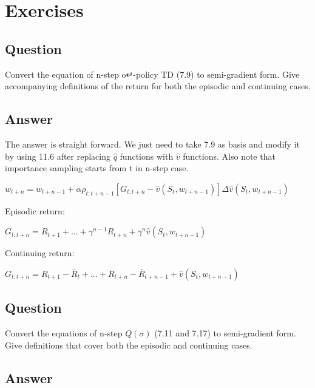\documentclass[11pt]{article}
\begin{document}
    \maketitle
    \setcounter{section}{10}


    \section{Exercises}

    \subsection{Question}

    Convert the equation of n-step o↵-policy TD (7.9) to semi-gradient form.
    Give accompanying definitions of the return for both the episodic and continuing cases.

    \subsection*{Answer}

    The answer is straight forward.
    We just need to take 7.9 as basis and modify it by using 11.6 after replacing $\hat{q}$ functions with $\hat{v}$ functions.
    Also note that importance sampling starts from t in n-step case.

    \noindent $ w_{t+n} = w_{t+n-1} + \alpha \rho_{t:t+n-1} [G_{t:t+n} - \hat{v}(S_t, w_{t+n-1}) ] \Delta\hat{v}(S_t, w_{t+n-1})$

    \hfill \break
    Episodic return:

    \noindent $ G_{t:t+n} = R_{t+1} + \ldots + \gamma^{n-1} R_{t+n} + \gamma^n \hat{v}(S_t,w_{t+n-1}) $

    \hfill \break
    \noindent Continuing return:

    \noindent $ G_{t:t+n} = R_{t+1} - \bar{R}_t + \ldots + R_{t+n} - \bar{R}_{t+n-1} + \hat{v}(S_t,w_{t+n-1}) $


    \subsection{Question}

    Convert the equations of n-step $Q( \sigma )$ (7.11 and 7.17) to semi-gradient form.
    Give definitions that cover both the episodic and continuing cases.

    \subsection*{Answer}
\end{document}
